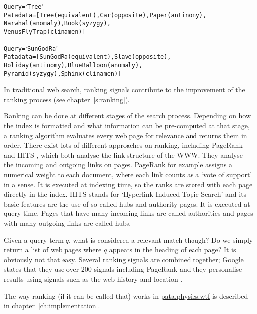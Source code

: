\begin{alltt}
Query    = `Tree'
Patadata = [Tree (equivalent),  Car (opposite), Paper (antinomy),
            Narwhal (anomaly), Book (syzygy), 
            Venus Fly Trap (clinamen)]

Query    = `Sun God Ra'
Patadata = [Sun God Ra (equivalent), Slave (opposite), 
            Holiday (antinomy), Blue Balloon (anomaly), 
            Pyramid (syzygy), Sphinx (clinamen)]
\end{alltt}

\spirals

In traditional web search, ranking signals contribute to the improvement of the ranking process (see chapter~\ref{s:ranking}).

Ranking can be done at different stages of the search process. Depending on how the index is formatted and what information can be pre-computed at that stage, a ranking algorithm evaluates every web page for relevance and returns them in order. There exist lots of different approaches on ranking, including PageRank \autocite{Brin1998} and HITS \autocite{Kleinberg1999}, which both analyse the link structure of the \ac{WWW}. They analyse the incoming and outgoing links on pages. PageRank for example assigns a numerical weight to each document, where each link counts as a `vote of support' in a sense. It is executed at indexing time, so the ranks are stored with each page directly in the index. HITS stands for `Hyperlink Induced Topic Search' and its basic features are the use of so called hubs and authority pages. It is executed at query time. Pages that have many incoming links are called authorities and pages with many outgoing links are called hubs.

Given a query term $q$, what is considered a relevant match though? Do we simply return a list of web pages where $q$ appears in the heading of each page? It is obviously not that easy. Several ranking signals are combined together; Google states that they use over \num{200} signals including PageRank and they personalise results using signals such as the web history and location \autocite*{Google2012}.

The way ranking (if it can be called that) works in \url{pata.physics.wtf} is described in chapter~\ref{ch:implementation}.


\stopcontents[chapters]
